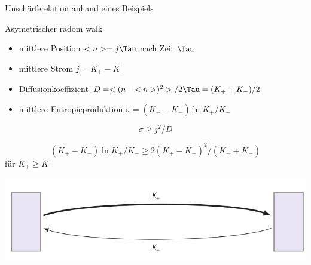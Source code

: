 \documentclass[aspectratio=1610, 9pt]{beamer}
\begin{document}
\begin{frame}{Unschärferelation anhand eines Beispiels}

\begin{minipage}{0.5\textwidth}

Asymetrischer radom walk
\begin{itemize}
  \item mittlere Position $<n>= j \Tau$ nach Zeit $\Tau$
  \item mittlere Strom $j = K_+ - K_-$
  \item Diffusionkoeffizient $D = <(n-<n>)^2> / 2 \Tau  = (K_+ + K_-)/2$
  \item mittlere Entropieproduktion $\sigma= (K_+ - K_-) \ln K_+ / K_-$
\end{itemize}

\begin{equation*}
\sigma \geq j^2 / D 
\end{equation*}

\begin{equation*}
  (K_+ - K_-) \ln K_+ / K_- \geq 2 (K_+ - K_-)^2 / (K_+ + K_-)
\end{equation*}
für $K_+  \geq K_-$

\end{minipage}
\begin{minipage}{0.49\textwidth}
  \begin{center}
    \includegraphics[width=\textwidth]{images/random.png}
  \end{center}
\end{minipage}
\end{frame}
\end{document}
